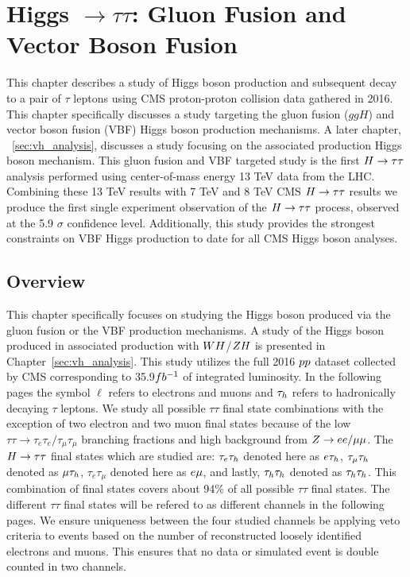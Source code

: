 \chapter{Higgs $\to \tau\tau$: Gluon Fusion and Vector Boson Fusion}
\label{sec:htt_analysis}

This chapter describes a study of Higgs boson production and subsequent
decay to a pair of $\tau$ leptons using CMS proton-proton collision data gathered in 2016. 
This chapter specifically discusses a study targeting the gluon fusion ($ggH$) and
vector boson fusion (VBF) Higgs boson production mechanisms. A later chapter, ~\ref{sec:vh_analysis},
discusses a study focusing on the associated production Higgs boson mechanism.
This gluon fusion and VBF targeted study is the first
$H\to\tau\tau$ analysis performed using center-of-mass energy 13 TeV data from the LHC. Combining
these 13 TeV results with 7 TeV and 8 TeV CMS $H\to\tau\tau$ results we produce
the first single experiment observation of the $H\to\tau\tau$ process, observed at the 5.9 $\sigma$
confidence level. Additionally, this study provides the strongest constraints on VBF Higgs 
production to date for all CMS Higgs boson analyses.



\section{Overview}

This chapter specifically focuses on studying the Higgs boson produced via the gluon fusion
or the VBF production mechanisms. A study of the Higgs boson produced in associated production with
$WH$/$ZH$ is presented in Chapter~\ref{sec:vh_analysis}. This study utilizes the
full 2016 $pp$ dataset collected by CMS corresponding to 35.9$fb^{-1}$ of integrated luminosity.
In the following pages the symbol $\ell$ refers to electrons and muons and $\tau_{h}$ refers to hadronically
decaying $\tau$ leptons. We study all possible $\tau\tau$ final state combinations with the
exception of two electron and two muon final states because of the low 
$\tau\tau \to \tau_{e}\tau_{e}/\tau_{\mu}\tau_{\mu}$
branching fractions and high background from $Z \to ee/\mu\mu$. The $H\to\tau\tau$ final states which are
studied are: $\tau_{e}\tau_{h}$ denoted here as $e\tau_{h}$, $\tau_{\mu}\tau_{h}$ denoted as $\mu\tau_{h}$,
$\tau_{e}\tau_{\mu}$ denoted here as $e\mu$, and lastly, $\tau_{h}\tau_{h}$ denoted as $\tau_{h}\tau_{h}$.
This combination of final states covers about 94\% of all possible $\tau\tau$ final states.
The different $\tau\tau$ final states will be refered to as different channels in the following pages.
We ensure uniqueness between the four studied channels be applying veto criteria to events based
on the number of reconstructed loosely identified electrons and muons. This ensures that 
no data or simulated event is double counted in two channels.

